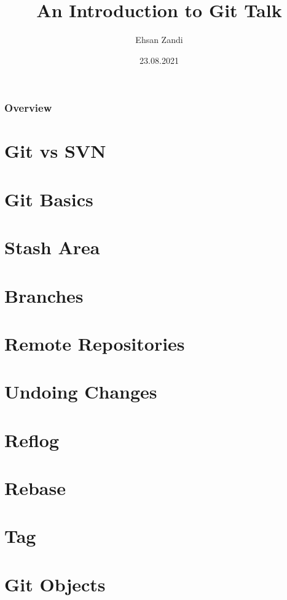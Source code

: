 \documentclass{beamer}
\title[Short title]{An Introduction to Git Talk} %
\author{Ehsan Zandi} %
\institute[DTIT] %
{
Deutsche Telekom IT \\ %
\medskip
ehsan.zandi@telekom.de
}
\date{23.08.2021} %
\begin{document}
\begin{frame}
\titlepage %
\end{frame}

\begin{frame}
\frametitle{Overview} %
\tableofcontents %
\end{frame}


\section{Git vs SVN} 
%
\section{Git Basics}





\section{Stash Area} 
\section{Branches} 
\section{Remote Repositories} 
\section{Undoing Changes} 
\section{Reflog}
\section{Rebase}
\section{Tag}
\section{Git Objects}
\end{document}
